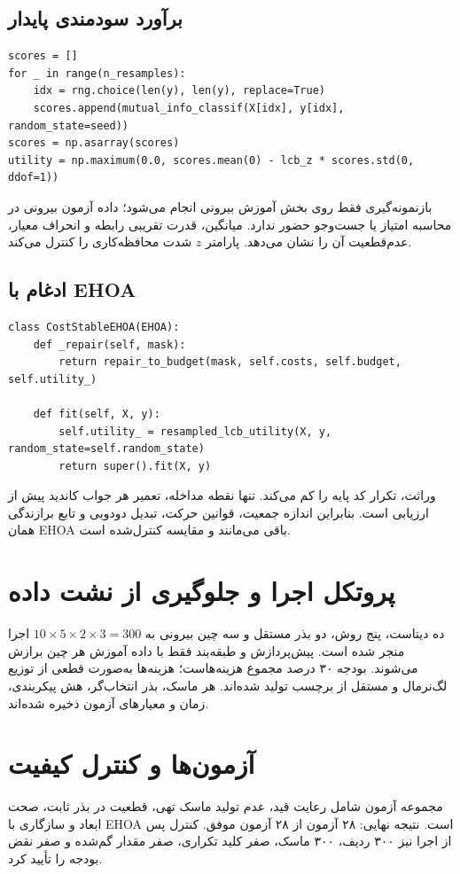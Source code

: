 \documentclass[12pt,a4paper]{article}
\newenvironment{latin}{\begin{otherlanguage}{english}}{\end{otherlanguage}}
\begin{document}
\subsection{برآورد سودمندی پایدار}
\begin{latin}\begin{lstlisting}
scores = []
for _ in range(n_resamples):
    idx = rng.choice(len(y), len(y), replace=True)
    scores.append(mutual_info_classif(X[idx], y[idx], random_state=seed))
scores = np.asarray(scores)
utility = np.maximum(0.0, scores.mean(0) - lcb_z * scores.std(0, ddof=1))
\end{lstlisting}\end{latin}
بازنمونه‌گیری فقط روی بخش آموزش بیرونی انجام می‌شود؛ داده آزمون بیرونی در محاسبه امتیاز یا جست‌وجو حضور ندارد. میانگین، قدرت تقریبی رابطه و انحراف معیار، عدم‌قطعیت آن را نشان می‌دهد. پارامتر $z$ شدت محافظه‌کاری را کنترل می‌کند.

\subsection{ادغام با EHOA}
\begin{latin}\begin{lstlisting}
class CostStableEHOA(EHOA):
    def _repair(self, mask):
        return repair_to_budget(mask, self.costs, self.budget, self.utility_)

    def fit(self, X, y):
        self.utility_ = resampled_lcb_utility(X, y, random_state=self.random_state)
        return super().fit(X, y)
\end{lstlisting}\end{latin}
وراثت، تکرار کد پایه را کم می‌کند. تنها نقطه مداخله، تعمیر هر جواب کاندید پیش از ارزیابی است. بنابراین اندازه جمعیت، قوانین حرکت، تبدیل دودویی و تابع برازندگی همان EHOA باقی می‌مانند و مقایسه کنترل‌شده است.

\section{پروتکل اجرا و جلوگیری از نشت داده}
ده دیتاست، پنج روش، دو بذر مستقل و سه چین بیرونی به $10\times5\times2\times3=300$ اجرا منجر شده است. پیش‌پردازش و طبقه‌بند فقط با داده آموزش هر چین برازش می‌شوند. بودجه ۳۰ درصد مجموع هزینه‌هاست؛ هزینه‌ها به‌صورت قطعی از توزیع لگ‌نرمال و مستقل از برچسب تولید شده‌اند. هر ماسک، بذر انتخاب‌گر، هش پیکربندی، زمان و معیارهای آزمون ذخیره شده‌اند.

\section{آزمون‌ها و کنترل کیفیت}
مجموعه آزمون شامل رعایت قید، عدم تولید ماسک تهی، قطعیت در بذر ثابت، صحت ابعاد و سازگاری با EHOA است. نتیجه نهایی: ۲۸ آزمون از ۲۸ آزمون موفق. کنترل پس از اجرا نیز ۳۰۰ ردیف، ۳۰۰ ماسک، صفر کلید تکراری، صفر مقدار گم‌شده و صفر نقض بودجه را تأیید کرد.
\end{document}
